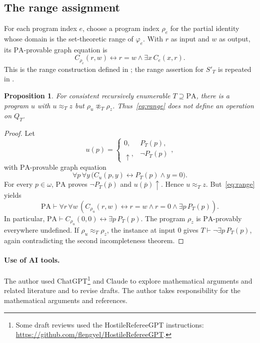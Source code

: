 \documentclass[11pt]{article}
\newtheorem{proposition}[theorem]{Proposition}
\newcommand{\PA}{\mathrm{PA}}
\begin{document}
\subsection{The range assignment}

For each program index $e$, choose a program index $\rho_e$ for the partial
identity whose domain is the set-theoretic range of $\varphi_e$. With $r$ as
input and $w$ as output, its $\PA$-provable graph equation is
\begin{equation}\label{eq:range}
 C_{\rho_e}(r,w)\longleftrightarrow
 r=w\land\exists x\,C_e(x,r).
\end{equation}
This is the range construction defined in
\cite[p.~111]{Montagna}; the range assertion for $S'_T$ is repeated in
\cite[p.~646]{DiPaolaMontagna}.

\begin{proposition}\label{prop:range}
For consistent recursively enumerable $T\supseteq\PA$, there is a program
$u$ with $u\approx_Tz$ but $\rho_u\not\approx_T\rho_z$.
Thus~\eqref{eq:range} does not define an operation on $Q_T$.
\end{proposition}

\begin{proof}
Let
\[
 u(p)=
 \begin{cases}
 0,&P_T(p),\\
 \uparrow,&\neg P_T(p)
 \end{cases},
\]
with $\PA$-provable graph equation
\[
 \forall p\,\forall y\,
 \bigl(C_u(p,y)\longleftrightarrow P_T(p)\land y=0\bigr).
\]
For every $p\in\omega$, $\PA$ proves $\neg P_T(\bar p)$ and
$u(\bar p)\uparrow$. Hence $u\approx_Tz$.
But~\eqref{eq:range} yields
\[
 \PA\vdash\forall r\,\forall w\,
 \left(C_{\rho_u}(r,w)\longleftrightarrow
       r=w\land r=0\land\exists p\,P_T(p)\right).
\]
In particular,
$\PA\vdash C_{\rho_u}(0,0)\leftrightarrow\exists p\,P_T(p)$.
The program $\rho_z$ is $\PA$-provably everywhere undefined.
If $\rho_u\approx_T\rho_z$, the instance at input $0$ gives
$T\vdash\neg\exists p\,P_T(p)$, again contradicting the second
incompleteness theorem.
\end{proof}

\paragraph{Use of AI tools.}
The author used ChatGPT\footnote{Some draft reviews used the
HostileRefereeGPT instructions:
\url{https://github.com/flengyel/HostileRefereeGPT}.}
and Claude to explore mathematical arguments and related literature
and to revise drafts. The author takes responsibility for the
mathematical arguments and references.
\end{document}
